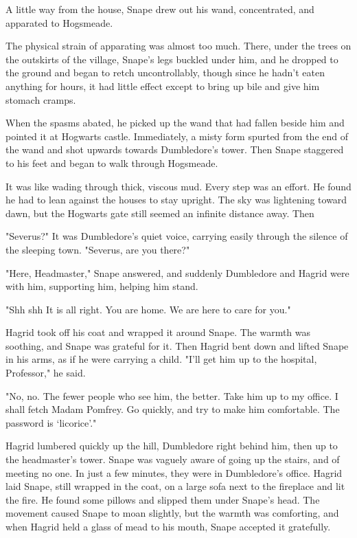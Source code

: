 A little way from the house, Snape drew out his wand, concentrated, and apparated to Hogsmeade.

The physical strain of apparating was almost too much. There, under the trees on the outskirts of the village, Snape's legs buckled under him, and he dropped to the ground and began to retch uncontrollably, though since he hadn't eaten anything for hours, it had little effect except to bring up bile and give him stomach cramps.

When the spasms abated, he picked up the wand that had fallen beside him and pointed it at Hogwarts castle. Immediately, a misty form spurted from the end of the wand and shot upwards towards Dumbledore's tower. Then Snape staggered to his feet and began to walk through Hogsmeade.

It was like wading through thick, viscous mud. Every step was an effort. He found he had to lean against the houses to stay upright. The sky was lightening toward dawn, but the Hogwarts gate still seemed an infinite distance away. Then{\el}

"Severus?" It was Dumbledore's quiet voice, carrying easily through the silence of the sleeping town. "Severus, are you there?"

"Here, Headmaster," Snape answered, and suddenly Dumbledore and Hagrid were with him, supporting him, helping him stand.

"Shh{\el} shh{\el} It is all right. You are home. We are here to care for you."

Hagrid took off his coat and wrapped it around Snape. The warmth was soothing, and Snape was grateful for it. Then Hagrid bent down and lifted Snape in his arms, as if he were carrying a child. "I'll get him up to the hospital, Professor," he said.

"No, no. The fewer people who see him, the better. Take him up to my office. I shall fetch Madam Pomfrey. Go quickly, and try to make him comfortable. The password is `licorice'."

Hagrid lumbered quickly up the hill, Dumbledore right behind him, then up to the headmaster's tower. Snape was vaguely aware of going up the stairs, and of meeting no one. In just a few minutes, they were in Dumbledore's office. Hagrid laid Snape, still wrapped in the coat, on a large sofa next to the fireplace and lit the fire. He found some pillows and slipped them under Snape's head. The movement caused Snape to moan slightly, but the warmth was comforting, and when Hagrid held a glass of mead to his mouth, Snape accepted it gratefully.

